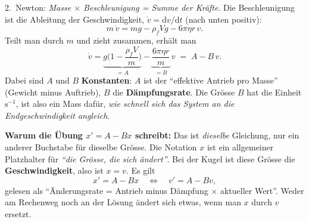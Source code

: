 \begin{werkzeugkasten}
2.~Newton: \emph{Masse $\times$ Beschleunigung = Summe der Kräfte}. Die
Beschleunigung ist die Ableitung der Geschwindigkeit, $\dot v=\mathrm dv/\mathrm dt$
(nach unten positiv):
\begin{equation}
  m\,\dot v = m g - \rho_f V g - 6\pi\eta r\, v .
\end{equation}
Teilt man durch $m$ und zieht zusammen, erhält man
\begin{equation}
  \dot v
  =\underbrace{g\Big(1-\frac{\rho_f V}{m}\Big)}_{=A}
   -\underbrace{\frac{6\pi\eta r}{m}}_{=B}\,v
  \;=\; A - B\, v .
\end{equation}
Dabei sind $A$ und $B$ \textbf{Konstanten}: $A$ ist der ``effektive Antrieb pro
Masse'' (Gewicht minus Auftrieb), $B$ die \textbf{Dämpfungsrate}. Die Grösse
$B$ hat die Einheit $\mathrm{s^{-1}}$, ist also ein Mass dafür, \emph{wie schnell
sich das System an die Endgeschwindigkeit angleich}.

\textbf{Warum die Übung $x'=A-Bx$ schreibt:} Das ist \emph{dieselbe} Gleichung,
nur ein anderer Buchstabe für dieselbe Grösse. Die Notation $x$ ist ein
allgemeiner Platzhalter für \emph{``die Grösse, die sich ändert''}. Bei der Kugel
ist diese Grösse die \textbf{Geschwindigkeit}, also ist $x=v$. Es gilt
\[
  x'=A-Bx \quad\Longleftrightarrow\quad v'=A-Bv ,
\]
gelesen als ``Änderungsrate = Antrieb minus Dämpfung $\times$ aktueller Wert''.
Weder am Rechenweg noch an der Lösung ändert sich etwas, wenn man $x$ durch
$v$ ersetzt.
\end{werkzeugkasten}

